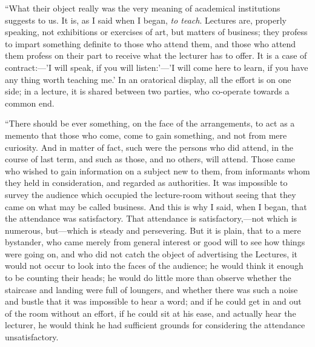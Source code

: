 ``What their object really was the very meaning of academical
institutions suggests to us. It is, as I said when I began, \emph{to
teach}. Lectures are, properly speaking, not exhibitions or
exercises of art, but matters of business; they profess to impart
something definite to those who attend them, and those who attend them
profess on their part to receive what the lecturer has to offer. It is
a case of contract:—'I will speak, if you will listen:'—'I will
come here to learn, if you have any thing worth teaching me.' In an
oratorical display, all the effort is on one side; in a lecture, it is
shared between two parties, who co-operate towards a common end.

``There should be ever something, on the face of the
arrangements, to act as a memento that those who come, come to gain
something, and not from mere curiosity. And in matter of fact, such
were the persons who did attend, in the course of last term, and such
as those, and no others, will attend. Those came who wished to gain
information on a subject new to them, from informants whom they held
in consideration, and regarded as authorities. It was impossible to
survey the audience which occupied the lecture-room without seeing
that they came on what may be called business. And this is why I said,
when I began, that the attendance was satisfactory. That attendance is
satisfactory,—not which is numerous, but—which is steady and
persevering. But it is plain, that to a mere bystander, who came
merely from general interest or good will to see how things were going
on, and who did not catch the object of advertising the Lectures, it
would not occur to look into the faces of the audience; he would think
it enough to be counting their heads; he would do little more
than observe whether the staircase and landing were full of loungers,
and whether there was such a noise and bustle that it was impossible
to hear a word; and if he could get in and out of the room without an
effort, if he could sit at his ease, and actually hear the lecturer,
he would think he had sufficient grounds for considering the
attendance unsatisfactory.

